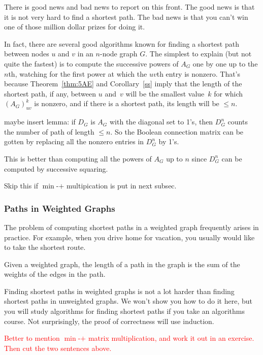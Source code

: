 There is good news and bad news to report on this front.  The good
news is that it is not very hard to find a shortest path.  The bad
news is that you can't win one of those million dollar prizes for
doing it.

In fact, there are several good algorithms known for finding a shortest
path between nodes $u$ and $v$ in an $n$-node graph $G$.  The simplest to
explain (but not quite the fastest) is to compute  the successive powers of $A_G$ one by one up to the
$n$th, watching for the first power at which the $uv$th entry is nonzero.
That's because Theorem~\ref{thm:5AE} and Corollary~\ref{ss} imply that the
length of the shortest path, if any, between $u$ and~$v$ will be the smallest
value~$k$ for which $(A_G)_{uv}^k$  is nonzero, and if there is a shortest
path, its length will be $\leq n$.

\begin{editingnotes}
maybe insert lemma: if $D_G$ is $A_G$ with the diagonal set to 1's, then $D_G^n$
counts the number of path of length $\leq n$.  So the Boolean connection
matrix can be gotten by replacing all the nonzero entries in $D_G^n$ by 1's.

This is better than computing all the powers of $A_G$ up to $n$ since
$D_G^n$ can be computed by successive squaring.

Skip this if $\min$-$+$ multipication is put in next subsec.
\end{editingnotes}

\subsubsection{Paths in Weighted Graphs}

The problem of computing shortest paths in a weighted graph frequently
arises in practice.  For example, when you drive home for vacation, you
usually would like to take the shortest route.

\begin{definition}\label{def:5H}
Given a weighted graph, the length of a path in the graph is the sum
of the weights of the edges in the path.
\end{definition}

\begin{editingnotes}

Finding shortest paths in weighted graphs is not a lot harder than
finding shortest paths in unweighted graphs.
We won't show you how to do it here, but you will study algorithms for
finding shortest paths if you take an algorithms course.  Not
surprisingly, the proof of correctness will use induction.

\textcolor{red}{Better to mention $\min$-$+$ matrix multiplication, and work it
  out in an exercise.  Then cut the two sentences above.
}

\end{editingnotes}

